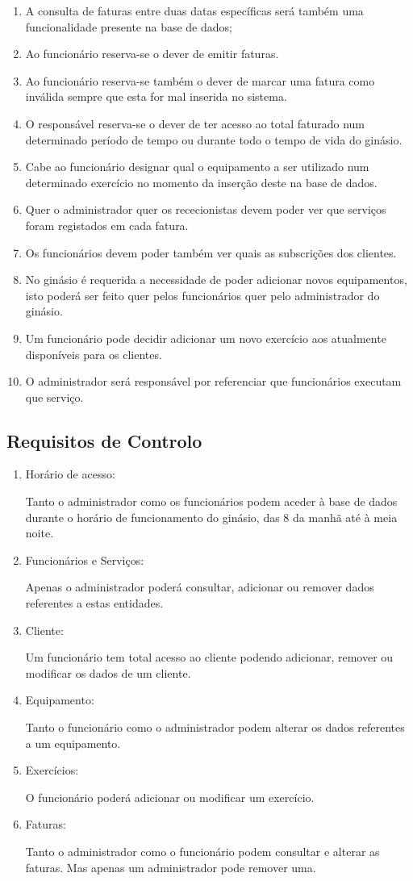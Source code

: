 \begin{enumerate}
    \item A consulta de faturas entre  duas datas específicas será também uma funcionalidade presente na base de dados;
    \item Ao funcionário reserva-se o dever de emitir faturas.
    \item Ao funcionário reserva-se também o dever de marcar uma fatura como inválida sempre que esta for mal inserida no sistema.
    \item O responsável reserva-se o dever de ter acesso ao total faturado num determinado período de tempo ou durante todo o tempo de vida do ginásio.
    \item Cabe ao funcionário designar qual o equipamento a ser utilizado num determinado exercício no momento da inserção deste na base de dados.
    \item Quer o administrador quer os rececionistas devem poder ver que serviços foram registados em cada fatura.
    \item Os funcionários devem poder também ver quais as subscrições dos clientes.
    \item No ginásio é requerida a necessidade de poder adicionar novos equipamentos, isto poderá ser feito quer pelos funcionários quer pelo administrador do ginásio.
    \item Um funcionário pode decidir adicionar um novo exercício aos atualmente disponíveis para os clientes.
    \item O administrador será responsável por referenciar que funcionários executam que serviço.
\end{enumerate}


\subsection{Requisitos de Controlo}

\begin{enumerate}
\item Horário de acesso:\par
Tanto o administrador como os funcionários podem aceder à base de dados durante o horário de funcionamento do ginásio, das 8 da manhã até à meia noite.
\item Funcionários e Serviços:\par
Apenas o administrador poderá consultar, adicionar ou remover dados referentes a estas entidades.
\item Cliente:\par
Um funcionário tem total acesso ao cliente podendo adicionar, remover ou modificar os dados de um cliente.
\item Equipamento:\par
Tanto o funcionário como o administrador podem alterar os dados referentes a um equipamento.
\item Exercícios:\par
O funcionário poderá adicionar ou modificar  um exercício.
\item Faturas:\par
Tanto o administrador como o funcionário podem consultar e alterar as faturas. Mas apenas um administrador pode remover uma.

\end{enumerate}

